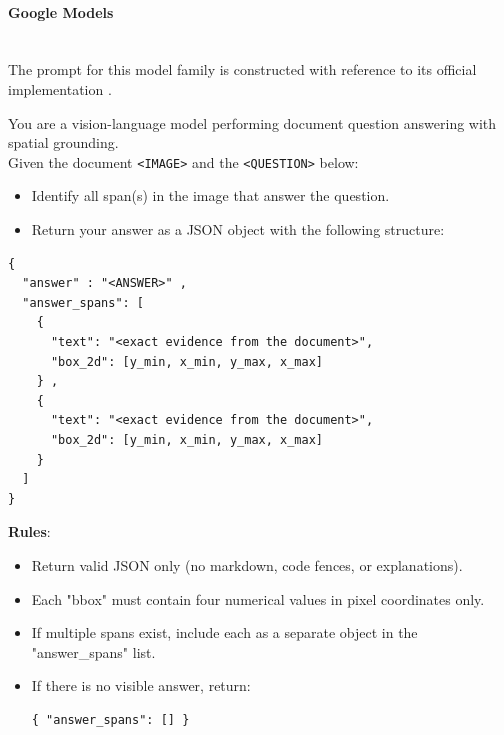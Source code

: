 \paragraph{Google Models}\mbox{}\\[4pt]
The prompt for this model family is constructed with reference to its official implementation \cite{google_vertex_bbox_2025}.
\begin{tcolorbox}[baseline_prompt_style, title=Gemini 2.5 Pro \cite{comanici2025gemini} and Gemma 3 \cite{team2025gemma}]


You are a vision-language model performing document question answering with spatial grounding. \\

Given the document \texttt{<IMAGE>} and the \texttt{<QUESTION>} below: 
\begin{itemize}[leftmargin=10pt]   

    \item Identify all span(s) in the image that answer the question. 
    \item Return your answer as a JSON object with the following structure:
\end{itemize}
    
\begin{verbatim}
{
  "answer" : "<ANSWER>" ,
  "answer_spans": [
    {
      "text": "<exact evidence from the document>",
      "box_2d": [y_min, x_min, y_max, x_max]
    } ,
    {
      "text": "<exact evidence from the document>",
      "box_2d": [y_min, x_min, y_max, x_max]
    }
  ]
}
\end{verbatim}
    
\textbf{Rules}: 
\begin{itemize}[leftmargin=10pt]
    \item Return valid JSON only (no markdown, code fences, or explanations). 
    \item  Each "bbox" must contain four numerical values in pixel coordinates only. 
    \item  If multiple spans exist, include each as a separate object in the "answer\_spans" list. 
    \item  If there is no visible answer, return: 
\begin{verbatim} 
{ "answer_spans": [] } 
\end{verbatim}
\end{itemize}
\end{tcolorbox}

